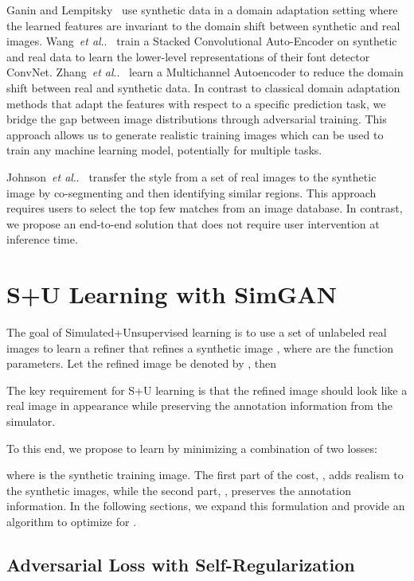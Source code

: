 \documentclass[10pt,twocolumn,letterpaper]{article}
\makeatletter
\DeclareRobustCommand\onedot{\futurelet\@let@token\@onedot}
\def\@onedot{\ifx\@let@token.\else.\null\fi\xspace}
\def\etal{\emph{et al}\onedot}
\makeatother
\begin{document}
Ganin and Lempitsky~\cite{Ganin14} use synthetic data in a domain adaptation setting where the learned features are invariant to the domain shift between synthetic and real images. 
Wang~\etal~\cite{Wang15} train a Stacked Convolutional Auto-Encoder on synthetic and real data to learn the lower-level representations of their font detector ConvNet.
Zhang~\etal~\cite{Zhang15} learn a Multichannel Autoencoder to reduce the domain shift between real and synthetic data.
In contrast to classical domain adaptation methods that adapt the features with respect to a specific prediction task, we bridge the gap between image distributions through adversarial training. 
This approach allows us to generate realistic training images which can be used to train any machine learning model, potentially for multiple tasks.

Johnson~\etal~\cite{johnson11cg2real} transfer the style from a set of real images to  the synthetic image by co-segmenting and then identifying similar regions. 
This approach requires users to select the top few matches from an image database. 
In contrast, we propose an end-to-end solution that does not require user intervention at inference time. 




\section{S+U Learning with SimGAN}


The goal of Simulated+Unsupervised learning is to use a set of unlabeled real images  to learn a refiner  that refines a synthetic image , where   are the function parameters. 
Let the refined image be denoted by  , then

The key requirement for S+U learning is that the refined image  should look like a real image in appearance while preserving the annotation information from the simulator.


To this end, we propose to learn  by minimizing a combination of two losses:

where  is the  synthetic training image. 
The first part of the cost, , adds realism to the synthetic images, while the second part, , preserves the annotation information.
In the following sections, we expand this formulation and provide an algorithm to optimize for .



\subsection{Adversarial Loss with Self-Regularization}
\end{document}
